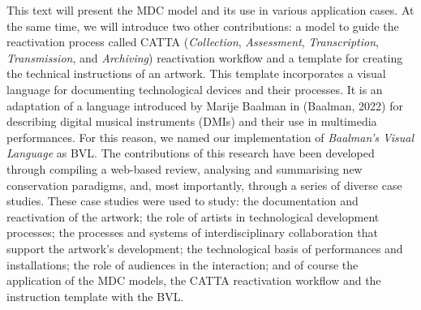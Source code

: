 This text will present the MDC model and its use in various application cases. At the same time, we will introduce two other contributions: a model to guide the reactivation process called CATTA (\textit{Collection}, \textit{Assessment}, \textit{Transcription}, \textit{Transmission}, and \textit{Archiving}) reactivation workflow and a template for creating the technical instructions of an artwork. This template incorporates a visual language for documenting technological devices and their processes. It is an adaptation of a language introduced by Marije Baalman in (Baalman, 2022) for describing digital musical instruments (DMIs) and their use in multimedia performances. For this reason, we named our implementation of \textit{Baalman’s Visual Language} as BVL. The contributions of this research have been developed through compiling a web-based review, analysing and summarising new conservation paradigms, and, most importantly, through a series of diverse case studies. These case studies were used to study: the documentation and reactivation of the artwork; the role of artists in technological development processes; the processes and systems of interdisciplinary collaboration that support the artwork’s development; the technological basis of performances and installations; the role of audiences in the interaction; and of course the application of the MDC models, the CATTA reactivation workflow and the instruction template with the BVL.\\

